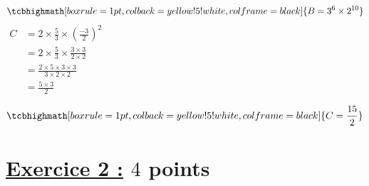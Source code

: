 \documentclass[12pt,a4paper]{article}
\begin{document}
\begin{enumerate}
\[
\tcbhighmath[boxrule=1pt, colback=yellow!5!white, colframe=black]{ B=3^6 \times 2^{10} }
\]
$
\begin{aligned}
C &= 2 \times \frac{5}{3} \times \left( \frac{-3}{2} \right)^2 \\
  &= 2 \times \frac{5}{3} \times \frac{3 \times 3}{2 \times 2} \\
  &= \frac{2 \times 5 \times 3 \times 3}{3 \times 2 \times 2} \\
  &= \frac{5 \times 3}{2}
\end{aligned}
$

\[
\tcbhighmath[boxrule=1pt, colback=yellow!5!white, colframe=black]{ C = \frac{15}{2} }
\]
\end{enumerate}

\section*{\underline{Exercice 2 :} $4$ points}
\end{document}
